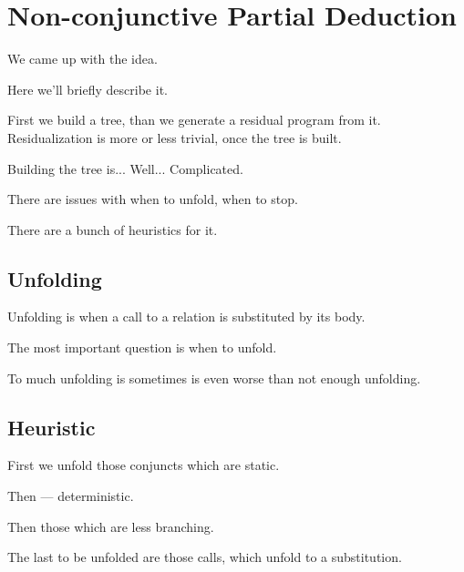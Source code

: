 \section{Non-conjunctive Partial Deduction}

We came up with the idea.

Here we'll briefly describe it.

First we build a tree, than we generate a residual program from it. Residualization is more or less trivial, once the tree is built.

Building the tree is... Well... Complicated.

There are issues with when to unfold, when to stop.

There are a bunch of heuristics for it.


\subsection{Unfolding}

Unfolding is when a call to a relation is substituted by its body.

The most important question is when to unfold.

To much unfolding is sometimes is even worse than not enough unfolding.

\subsection{Heuristic}

First we unfold those conjuncts which are static.

Then --- deterministic.

Then those which are less branching.

The last to be unfolded are those calls, which unfold to a substitution.